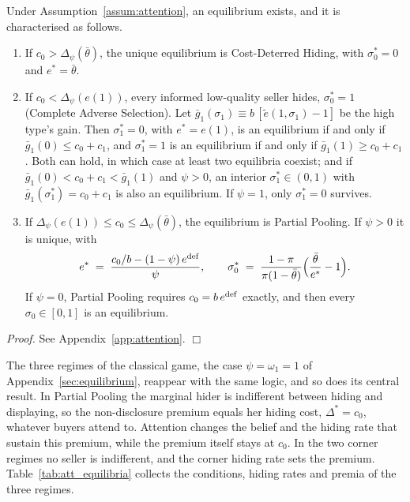 \begin{proposition}
\label{prop:att_equilibrium}
Under Assumption~\ref{assum:attention}, an equilibrium exists, and it is characterised as follows.
\begin{enumerate}[label=(\roman*)]
    \item If $c_0>\Delta_\psi(\bar\theta)$, the unique equilibrium is Cost-Deterred Hiding, with $\sigma_0^*=0$ and $e^*=\bar\theta$.
    \item If $c_0<\Delta_\psi(e(1))$, every informed low-quality seller hides, $\sigma_0^*=1$ (Complete Adverse Selection). Let $\bar g_1(\sigma_1)\equiv b\,[\tilde e(1,\sigma_1)-1]$ be the high type's gain. Then $\sigma_1^*=0$, with $e^*=e(1)$, is an equilibrium if and only if $\bar g_1(0)\le c_0+c_1$, and $\sigma_1^*=1$ is an equilibrium if and only if $\bar g_1(1)\ge c_0+c_1$. Both can hold, in which case at least two equilibria coexist; and if $\bar g_1(0)<c_0+c_1<\bar g_1(1)$ and $\psi>0$, an interior $\sigma_1^*\in(0,1)$ with $\bar g_1(\sigma_1^*)=c_0+c_1$ is also an equilibrium. If $\psi=1$, only $\sigma_1^*=0$ survives.
    \item If $\Delta_\psi(e(1))\le c_0\le\Delta_\psi(\bar\theta)$, the equilibrium is Partial Pooling. If $\psi>0$ it is unique, with
    \begin{equation}
        e^*\;=\;\frac{c_0/b-(1-\psi)\,e^{\rm def}}{\psi},\qquad \sigma_0^*\;=\;\frac{1-\pi}{\pi(1-\bar\theta)}\Big(\frac{\bar\theta}{e^*}-1\Big).
        \label{eq:att_pp}
    \end{equation}
    If $\psi=0$, Partial Pooling requires $c_0=b\,e^{\rm def}$ exactly, and then every $\sigma_0\in[0,1]$ is an equilibrium.
\end{enumerate}
\end{proposition}

\noindent\textit{Proof.} See Appendix~\ref{app:attention}. $\Box$

The three regimes of the classical game, the case $\psi=\omega_1=1$ of Appendix~\ref{sec:equilibrium}, reappear with the same logic, and so does its central result. In Partial Pooling the marginal hider is indifferent between hiding and displaying, so the non-disclosure premium equals her hiding cost, $\Delta^*=c_0$, whatever buyers attend to. Attention changes the belief and the hiding rate that sustain this premium, while the premium itself stays at $c_0$. In the two corner regimes no seller is indifferent, and the corner hiding rate sets the premium. Table~\ref{tab:att_equilibria} collects the conditions, hiding rates and premia of the three regimes.

